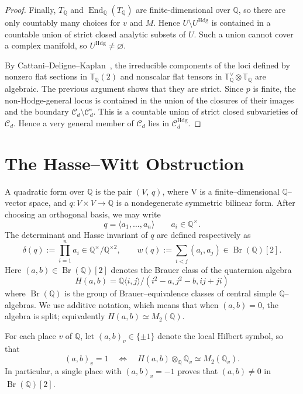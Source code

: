 \documentclass[10pt]{amsart}
\numberwithin{equation}{section}
\theoremstyle{definition}
\theoremstyle{plain}
\numberwithin{theorem}{section}
\def\QQ{{\mathbb{Q}}}
\DeclareMathOperator{\Br}{Br}
\newcommand{\Q}{\mathbb{Q}}
\newcommand{\End}{\operatorname{End}}
\begin{document}
\begin{proof}
Finally, $T_{\Q}$ and $\End_{\Q}(T_{\Q})$ are finite-dimensional over
$\Q$, so there are only countably many choices for $v$
and $M$. Hence $U\setminus U^{\mathrm{Hdg}}$ is contained in a countable union of strict closed analytic subsets of $U$. Such a union cannot cover a complex manifold, so $U^{\mathrm{Hdg}}\neq\varnothing$.

By Cattani--Deligne--Kaplan~\cite[Corollary~1.3]{CDK}, the irreducible components of the loci defined by nonzero flat sections in $\mathbb T_{\Q}(2)$ and nonscalar flat tensors in
$\mathbb T_{\mathbb Q}^{\vee}\otimes\mathbb T_{\mathbb Q}$ are
algebraic. The previous argument shows that they are strict. Since $p$ is finite, the non-Hodge-general locus is contained in the union of the closures of their images and the boundary $\mathcal C_d\setminus\mathcal C_d^\circ$. This is a countable union of strict closed subvarieties of $\mathcal C_d$. Hence a very general member of $\mathcal C_d$ lies in $\mathcal C_d^{\mathrm{Hdg}}$.

\end{proof}
 


\section{The Hasse--Witt Obstruction}\label{sec:hasse}

A quadratic form over $\Q$ is the pair $(V,\,q)$, where V is a finite--dimensional $\Q$--vector space, and $q: V \times V\rightarrow \Q$ is a nondegenerate symmetric bilinear form. After choosing an orthogonal basis, we may write \[
q=\langle a_1,\ldots,a_n\rangle\qquad a_i\in\QQ^\times.
\] 
The determinant and Hasse invariant of $q$ are defined respectively as
\[
\delta(q):=\prod_{i=1}^n a_i
\in\QQ^\times/\QQ^{\times 2},
\qquad
w(q):=\sum_{i<j}(a_i,a_j)
\in\Br(\QQ)[2].
\] 
Here $(a,b)\in\Br(\QQ)[2]$ denotes the Brauer class of the quaternion algebra $$H(a,b)=\Q\langle i,j\rangle/(i^2-a,j^2-b,ij+ji)$$ where $\Br(\QQ)$ is the group of Brauer--equivalence classes of
central simple $\QQ$--algebras. We use additive notation, which means that when  $(a,b)=0$, the algebra is split; equivalently $H(a,b)\simeq M_2(\QQ)$.

For each place $v$ of $\QQ$, let $(a,b)_v\in\{\pm1\}$ denote the local Hilbert symbol, so that
\[
(a,b)_v=1
\quad\Longleftrightarrow\quad
H(a,b)\otimes_{\QQ}\QQ_v\simeq M_2(\QQ_v).
\]
In particular, a single place with $(a,b)_v=-1$ proves that $(a,b)\neq0$ in $\Br(\QQ)[2]$.
\end{document}
